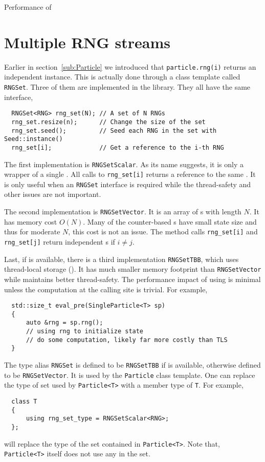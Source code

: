 \begin{table}
  \caption{Performance of \protect\mkl{} \protect\rng}
  \label{tab:Performance of MKL RNG}
\end{table}

\section{Multiple RNG streams}
\label{sec:Multiple RNG streams}

Earlier in section~\ref{sub:Particle} we introduced that \verb|particle.rng(i)|
returns an independent \rng instance. This is actually done through a class
template called \verb|RNGSet|. Three of them are implemented in the library.
They all have the same interface,
\begin{Verbatim}
  RNGSet<RNG> rng_set(N); // A set of N RNGs
  rng_set.resize(n);      // Change the size of the set
  rng_set.seed();         // Seed each RNG in the set with Seed::instance()
  rng_set[i];             // Get a reference to the i-th RNG
\end{Verbatim}
The first implementation is \verb|RNGSetScalar|. As its name suggests, it is
only a wrapper of a single \rng. All calls to \verb|rng_set[i]| returns a
reference to the same \rng. It is only useful when an \verb|RNGSet| interface
is required while the thread-safety and other issues are not important.

The second implementation is \verb|RNGSetVector|. It is an array of \rng{}s
with length $N$. It has memory cost $O(N)$. Many of the counter-based \rng{}s
have small state size and thus for moderate $N$, this cost is not an issue. The
method calls \verb|rng_set[i]| and \verb|rng_set[j]| return independent \rng{}s
if $i \ne j$.

Last, if \tbb is available, there is a third implementation \verb|RNGSetTBB|,
which uses thread-local storage (\tls). It has much smaller memory footprint
than \verb|RNGSetVector| while maintains better thread-safety. The performance
impact of using \tls is minimal unless the computation at the calling site is
trivial. For example,
\begin{Verbatim}
  std::size_t eval_pre(SingleParticle<T> sp)
  {
      auto &rng = sp.rng();
      // using rng to initialize state
      // do some computation, likely far more costly than TLS
  }
\end{Verbatim}
The type alias \verb|RNGSet| is defined to be \verb|RNGSetTBB| if \tbb is
available, otherwise defined to be \verb|RNGSetVector|. It is used by the
\verb|Particle| class template. One can replace the type of \rng set used by
\verb|Particle<T>| with a member type of \verb|T|. For example,
\begin{Verbatim}
  class T
  {
      using rng_set_type = RNGSetScalar<RNG>;
  };
\end{Verbatim}
will replace the type of the \rng set contained in \verb|Particle<T>|. Note
that, \verb|Particle<T>| itself does not use any \rng in the set.

